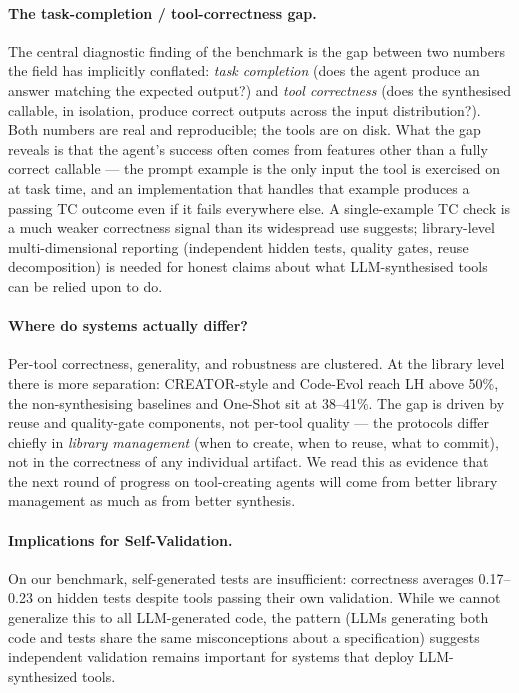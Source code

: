 \documentclass[sigconf,anonymous,review,natbib=false]{acmart}
\begin{document}
\paragraph{The task-completion / tool-correctness gap.}
\label{sec:discussion_tcgap}
The central diagnostic finding of the benchmark is the gap between two numbers the field has implicitly conflated: \emph{task completion} (does the agent produce an answer matching the expected output?) and \emph{tool correctness} (does the synthesised callable, in isolation, produce correct outputs across the input distribution?). Both numbers are real and reproducible; the tools are on disk. What the gap reveals is that the agent's success often comes from features other than a fully correct callable --- the prompt example is the only input the tool is exercised on at task time, and an implementation that handles that example produces a passing TC outcome even if it fails everywhere else. A single-example TC check is a much weaker correctness signal than its widespread use suggests; library-level multi-dimensional reporting (independent hidden tests, quality gates, reuse decomposition) is needed for honest claims about what LLM-synthesised tools can be relied upon to do.

\paragraph{Where do systems actually differ?} Per-tool correctness, generality, and robustness are clustered. At the library level there is more separation: CREATOR-style and Code-Evol reach LH above 50\%, the non-synthesising baselines and One-Shot sit at 38--41\%. The gap is driven by reuse and quality-gate components, not per-tool quality --- the protocols differ chiefly in \emph{library management} (when to create, when to reuse, what to commit), not in the correctness of any individual artifact. We read this as evidence that the next round of progress on tool-creating agents will come from better library management as much as from better synthesis.

\paragraph{Implications for Self-Validation.} On our benchmark, self-generated tests are insufficient: correctness averages 0.17--0.23 on hidden tests despite tools passing their own validation. While we cannot generalize this to all LLM-generated code, the pattern (LLMs generating both code and tests share the same misconceptions about a specification) suggests independent validation remains important for systems that deploy LLM-synthesized tools.
\end{document}
